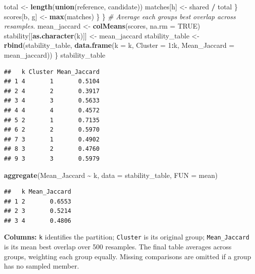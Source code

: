 \documentclass[
  10pt,
]{article}
\newenvironment{Shaded}{\begin{snugshade}}{\end{snugshade}}
\newcommand{\AttributeTok}[1]{\textcolor[rgb]{0.13,0.29,0.53}{#1}}
\newcommand{\CommentTok}[1]{\textcolor[rgb]{0.56,0.35,0.01}{\textit{#1}}}
\newcommand{\ConstantTok}[1]{\textcolor[rgb]{0.56,0.35,0.01}{#1}}
\newcommand{\DecValTok}[1]{\textcolor[rgb]{0.00,0.00,0.81}{#1}}
\newcommand{\FunctionTok}[1]{\textcolor[rgb]{0.13,0.29,0.53}{\textbf{#1}}}
\newcommand{\NormalTok}[1]{#1}
\newcommand{\OtherTok}[1]{\textcolor[rgb]{0.56,0.35,0.01}{#1}}
\newcommand{\SpecialCharTok}[1]{\textcolor[rgb]{0.81,0.36,0.00}{\textbf{#1}}}
\begin{document}
\begin{Shaded}
\begin{Highlighting}[]
\NormalTok{        total }\OtherTok{\textless{}{-}} \FunctionTok{length}\NormalTok{(}\FunctionTok{union}\NormalTok{(reference, candidate))}
\NormalTok{        matches[h] }\OtherTok{\textless{}{-}}\NormalTok{ shared }\SpecialCharTok{/}\NormalTok{ total}
\NormalTok{      \}}
\NormalTok{      scores[b, g] }\OtherTok{\textless{}{-}} \FunctionTok{max}\NormalTok{(matches)}
\NormalTok{    \}}
\NormalTok{  \}}
  \CommentTok{\# Average each group\textquotesingle{}s best overlap across resamples.}
\NormalTok{  mean\_jaccard }\OtherTok{\textless{}{-}} \FunctionTok{colMeans}\NormalTok{(scores, }\AttributeTok{na.rm =} \ConstantTok{TRUE}\NormalTok{)}
\NormalTok{  stability[[}\FunctionTok{as.character}\NormalTok{(k)]] }\OtherTok{\textless{}{-}}\NormalTok{ mean\_jaccard}
\NormalTok{  stability\_table }\OtherTok{\textless{}{-}} \FunctionTok{rbind}\NormalTok{(stability\_table,}
    \FunctionTok{data.frame}\NormalTok{(}\AttributeTok{k =}\NormalTok{ k, }\AttributeTok{Cluster =} \DecValTok{1}\SpecialCharTok{:}\NormalTok{k, }\AttributeTok{Mean\_Jaccard =}\NormalTok{ mean\_jaccard))}
\NormalTok{\}}
\NormalTok{stability\_table}
\end{Highlighting}
\end{Shaded}

\begin{verbatim}
##   k Cluster Mean_Jaccard
## 1 4       1       0.5104
## 2 4       2       0.3917
## 3 4       3       0.5633
## 4 4       4       0.4572
## 5 2       1       0.7135
## 6 2       2       0.5970
## 7 3       1       0.4902
## 8 3       2       0.4760
## 9 3       3       0.5979
\end{verbatim}

\begin{Shaded}
\begin{Highlighting}[]
\FunctionTok{aggregate}\NormalTok{(Mean\_Jaccard }\SpecialCharTok{\textasciitilde{}}\NormalTok{ k, }\AttributeTok{data =}\NormalTok{ stability\_table, }\AttributeTok{FUN =}\NormalTok{ mean)}
\end{Highlighting}
\end{Shaded}

\begin{verbatim}
##   k Mean_Jaccard
## 1 2       0.6553
## 2 3       0.5214
## 3 4       0.4806
\end{verbatim}

\textbf{Columns:} \texttt{k} identifies the partition; \texttt{Cluster}
is its original group; \texttt{Mean\_Jaccard} is its mean best overlap
over 500 resamples. The final table averages across groups, weighting
each group equally. Missing comparisons are omitted if a group has no
sampled member.
\end{document}
